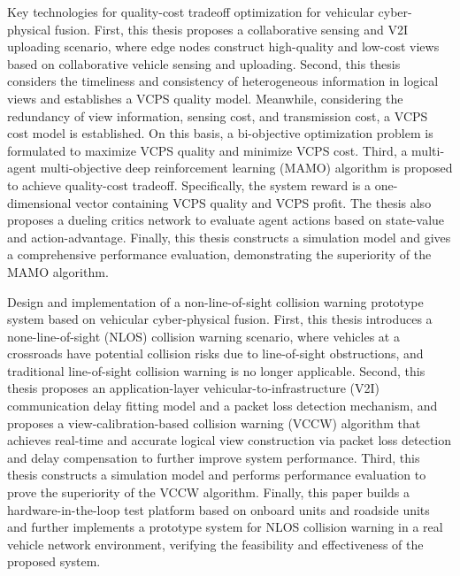 \begin{eabstract}
 Key technologies for quality-cost tradeoff optimization for vehicular cyber-physical fusion. First, this thesis proposes a collaborative sensing and V2I uploading scenario, where edge nodes construct high-quality and low-cost views based on collaborative vehicle sensing and uploading. Second, this thesis considers the timeliness and consistency of heterogeneous information in logical views and establishes a VCPS quality model. Meanwhile, considering the redundancy of view information, sensing cost, and transmission cost, a VCPS cost model is established. On this basis, a bi-objective optimization problem is formulated to maximize VCPS quality and minimize VCPS cost. Third, a multi-agent multi-objective deep reinforcement learning (MAMO) algorithm is proposed to achieve quality-cost tradeoff. Specifically, the system reward is a one-dimensional vector containing VCPS quality and VCPS profit. The thesis also proposes a dueling critics network to evaluate agent actions based on state-value and action-advantage. Finally, this thesis constructs a simulation model and gives a comprehensive performance evaluation, demonstrating the superiority of the MAMO algorithm.

 Design and implementation of a non-line-of-sight collision warning prototype system based on vehicular cyber-physical fusion. First, this thesis introduces a none-line-of-sight (NLOS) collision warning scenario, where vehicles at a crossroads have potential collision risks due to line-of-sight obstructions, and traditional line-of-sight collision warning is no longer applicable. Second, this thesis proposes an application-layer vehicular-to-infrastructure (V2I) communication delay fitting model and a packet loss detection mechanism, and proposes a view-calibration-based collision warning (VCCW) algorithm that achieves real-time and accurate logical view construction via packet loss detection and delay compensation to further improve system performance. Third, this thesis constructs a simulation model and performs performance evaluation to prove the superiority of the VCCW algorithm. Finally, this paper builds a hardware-in-the-loop test platform based on onboard units and roadside units and further implements a prototype system for NLOS collision warning in a real vehicle network environment, verifying the feasibility and effectiveness of the proposed system.
 
\end{eabstract}

